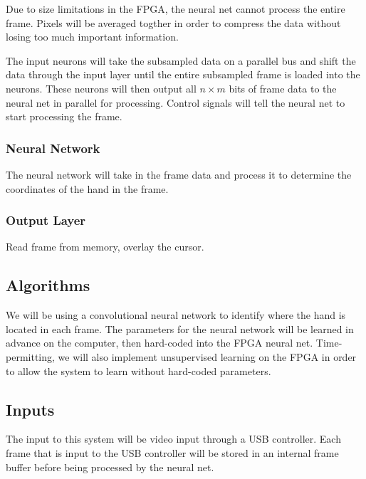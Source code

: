 \documentclass[10pt]{article}
\begin{document}
Due to size limitations in the FPGA, the neural net cannot process the entire
frame. Pixels will be averaged togther in order to compress the data without
losing too much important information. 

The input neurons will take the subsampled data on a parallel bus and shift the
data through the input layer until the entire subsampled frame is loaded into
the neurons. These neurons will then output all $n \times m$ bits of frame data
to the neural net in parallel for processing. Control signals will tell the
neural net to start processing the frame.

\subsubsection{Neural Network}
\label{ssub:neural_network}

The neural network will take in the frame data and process it to determine the
coordinates of the hand in the frame. 

\subsubsection{Output Layer}
\label{ssub:output_layer}

Read frame from memory, overlay the cursor. 

\subsection{Algorithms}
\label{sub:algorithms}

We will be using a convolutional neural network to identify where the hand is
located in each frame. The parameters for the neural network will be learned in
advance on the computer, then hard-coded into the FPGA neural net.
Time-permitting, we will also implement unsupervised learning on the FPGA in
order to allow the system to learn without hard-coded parameters.

\subsection{Inputs}
\label{sub:inputs}

The input to this system will be video input through a USB controller. Each
frame that is input to the USB controller will be stored in an internal frame
buffer before being processed by the neural net.
\end{document}
